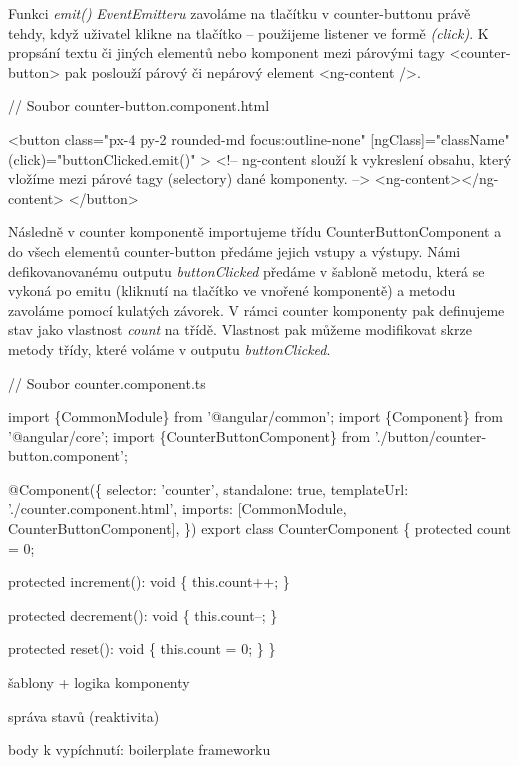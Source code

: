 Funkci \emph{emit()} \emph{EventEmitteru} zavoláme na tlačítku v counter-buttonu právě tehdy, když uživatel klikne na tlačítko -- použijeme listener ve formě \emph{(click)}. 
K propsání textu či jiných elementů nebo komponent mezi párovými tagy <counter-button> pak poslouží párový či nepárový element <ng-content />.

\begin{prog}
// Soubor counter-button.component.html

<button
  class="px-4 py-2 rounded-md focus:outline-none"
  [ngClass]="className"
  (click)="buttonClicked.emit()"
>
  <!-- ng-content slouží k vykreslení obsahu, který vložíme
   mezi párové tagy (selectory) dané komponenty. -->
  <ng-content></ng-content>
</button>
\end{prog}

Následně v counter komponentě importujeme třídu CounterButtonComponent a do všech elementů counter-button předáme jejich vstupy a výstupy. 
Námi defikovanovanému outputu \emph{buttonClicked} předáme v šabloně metodu, která se vykoná po emitu (kliknutí na tlačítko ve vnořené komponentě) a metodu zavoláme pomocí kulatých závorek. 
V rámci counter komponenty pak definujeme stav jako vlastnost \emph{count} na třídě. Vlastnost pak můžeme modifikovat skrze metody třídy, které voláme v outputu \emph{buttonClicked}.

\begin{prog}
// Soubor counter.component.ts

import \{CommonModule\} from '@angular/common';
import \{Component\} from '@angular/core';
import \{CounterButtonComponent\} from './button/counter-button.component';

@Component(\{
  selector: 'counter',
  standalone: true,
  templateUrl: './counter.component.html',
  imports: [CommonModule, CounterButtonComponent],
\})
export class CounterComponent \{
  protected count = 0;

  protected increment(): void \{
    this.count++;
  \}

  protected decrement(): void \{
    this.count--;
  \}

  protected reset(): void \{
    this.count = 0;
  \}
\}
\end{prog}

\begin{citemize}
	\item šablony + logika komponenty
	\item správa stavů (reaktivita)
	\item body k vypíchnutí: boilerplate frameworku
\end{citemize}

